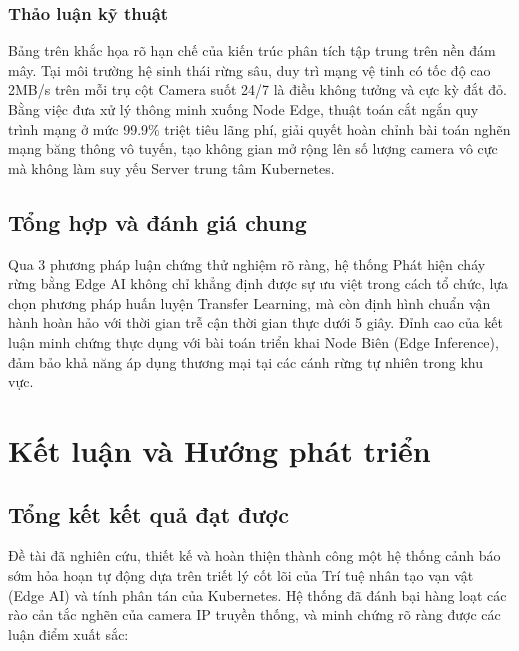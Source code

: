 \documentclass[12pt,a4paper]{report}
\begin{document}
\subsection{Thảo luận kỹ thuật}
Bảng trên khắc họa rõ hạn chế của kiến trúc phân tích tập trung trên nền đám mây. Tại môi trường hệ sinh thái rừng sâu, duy trì mạng vệ tinh có tốc độ cao 2MB/s trên mỗi trụ cột Camera suốt 24/7 là điều không tưởng và cực kỳ đắt đỏ. 
Bằng việc đưa xử lý thông minh xuống Node Edge, thuật toán cắt ngắn quy trình mạng ở mức 99.9\% triệt tiêu lãng phí, giải quyết hoàn chỉnh bài toán nghẽn mạng băng thông vô tuyến, tạo không gian mở rộng lên số lượng camera vô cực mà không làm suy yếu Server trung tâm Kubernetes.

\section{Tổng hợp và đánh giá chung}

Qua 3 phương pháp luận chứng thử nghiệm rõ ràng, hệ thống Phát hiện cháy rừng bằng Edge AI không chỉ khẳng định được sự ưu việt trong cách tổ chức, lựa chọn phương pháp huấn luyện Transfer Learning, mà còn định hình chuẩn vận hành hoàn hảo với thời gian trễ cận thời gian thực dưới 5 giây. Đỉnh cao của kết luận minh chứng thực dụng với bài toán triển khai Node Biên (Edge Inference), đảm bảo khả năng áp dụng thương mại tại các cánh rừng tự nhiên trong khu vực.
\chapter{Kết luận và Hướng phát triển}

\section{Tổng kết kết quả đạt được}

Đề tài đã nghiên cứu, thiết kế và hoàn thiện thành công một hệ thống cảnh báo sớm hỏa hoạn tự động dựa trên triết lý cốt lõi của Trí tuệ nhân tạo vạn vật (Edge AI) và tính phân tán của Kubernetes. Hệ thống đã đánh bại hàng loạt các rào cản tắc nghẽn của camera IP truyền thống, và minh chứng rõ ràng được các luận điểm xuất sắc:
\end{document}
